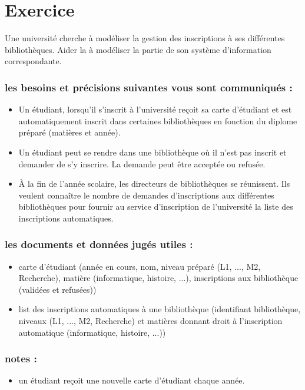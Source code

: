 \section*{Exercice}
Une université cherche à modéliser la gestion des inscriptions à ses différentes bibliothèques. 
Aider la à modéliser la partie de son système d'information correspondante.

\subsubsection*{les besoins et précisions suivantes vous sont communiqués :}
\begin{itemize}
    \item Un étudiant, lorsqu'il s'inscrit à l'université reçoit sa carte d'étudiant et est automatiquement inscrit dans certaines bibliothèques en fonction du diplome préparé (matières et année). 
    \item Un étudiant peut se rendre dans une bibliothèque où il n'est pas inscrit et demander de s'y inscrire. La demande peut être acceptée ou refusée.
    \item À la fin de l'année scolaire, les directeurs de bibliothèques se réunissent. Ils veulent connaître le nombre de demandes d'inscriptions aux différentes bibliothèques pour fournir au service d'inscription de l'université la liste des inscriptions automatiques.
\end{itemize}

\subsubsection*{les documents et données jugés utiles :}
\begin{itemize}
    \item carte d'étudiant (année en cours, nom, niveau préparé (L1, ..., M2, Recherche), matière (informatique, histoire, ...), inscriptions aux bibliothèque (validées et refusées))
    \item list des inscriptions automatiques à une bibliothèque (identifiant bibliothèque, niveaux (L1, ..., M2, Recherche) et matières donnant droit à l'inscription automatique (informatique, histoire, ...))
\end{itemize}

\subsubsection*{notes :}
\begin{itemize}
    \item un étudiant reçoit une nouvelle carte d'étudiant chaque année.
\end{itemize}
